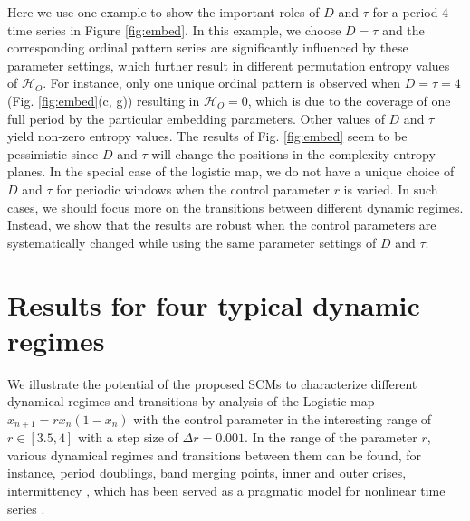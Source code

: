 \documentclass[12pt,aip,cha,reprint,nofootinbib]{revtex4-1}
\begin{document}
Here we use one example to show the important roles of $D$ and $\tau$ for a period-4 time series in Figure \ref{fig:embed}. In this example, we choose $D = \tau $ and the corresponding ordinal pattern series are significantly influenced by these parameter settings, which further result in different permutation entropy values of $\mathcal{H}_O$.  For instance, only one unique ordinal pattern is observed when $D = \tau = 4$ (Fig. \ref{fig:embed}(c, g)) resulting in $\mathcal{H}_O = 0$, which is due to the coverage of one full period by the particular embedding parameters. Other values of $D$ and $\tau$ yield non-zero entropy values. The results of Fig. \ref{fig:embed} seem to be pessimistic since $D$ and $\tau$ will change the positions in the complexity-entropy planes. In the special case of the logistic map, we do not have a unique choice of $D$ and $\tau$ for periodic windows when the control parameter $r$ is varied. In such cases, we should focus more on the transitions between different dynamic regimes. Instead, we show that the results are robust when the control parameters are systematically changed while using the same parameter settings of $D$ and $\tau$.

\section{Results for four typical dynamic regimes} \label{sec:four}
We illustrate the potential of the proposed SCMs to characterize different dynamical regimes and transitions by analysis of the Logistic map $x_{n+1} = r x_n (1 - x_n)$ with the control parameter in the interesting range of $r \in [3.5, 4]$ with a step size of $\Delta r = 0.001$. In the range of the parameter $r$, various dynamical regimes and transitions between them can be found, for instance, period doublings, band merging points, inner and outer crises, intermittency \cite{Kantz97}, which has been served as a pragmatic model for nonlinear time series \cite{MarwanPLA2009}. 
\end{document}
